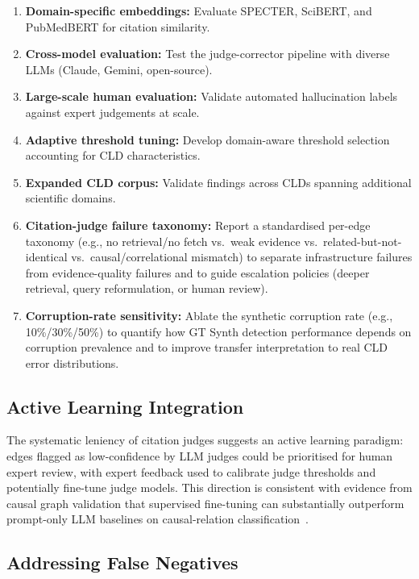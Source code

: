 \begin{enumerate}[noitemsep]
    \item \textbf{Domain-specific embeddings:} Evaluate SPECTER, SciBERT, and PubMedBERT for citation similarity.
    \item \textbf{Cross-model evaluation:} Test the judge-corrector pipeline with diverse LLMs (Claude, Gemini, open-source).
    \item \textbf{Large-scale human evaluation:} Validate automated hallucination labels against expert judgements at scale.
    \item \textbf{Adaptive threshold tuning:} Develop domain-aware threshold selection accounting for CLD characteristics.
    \item \textbf{Expanded CLD corpus:} Validate findings across CLDs spanning additional scientific domains.
    \item \textbf{Citation-judge failure taxonomy:} Report a standardised per-edge taxonomy (e.g., no retrieval/no fetch vs.\ weak evidence vs.\ related-but-not-identical vs.\ causal/correlational mismatch) to separate infrastructure failures from evidence-quality failures and to guide escalation policies (deeper retrieval, query reformulation, or human review).
    \item \textbf{Corruption-rate sensitivity:} Ablate the synthetic corruption rate (e.g., 10\%/30\%/50\%) to quantify how GT Synth detection performance depends on corruption prevalence and to improve transfer interpretation to real CLD error distributions.
\end{enumerate}

\subsection{Active Learning Integration}

The systematic leniency of citation judges suggests an active learning paradigm: edges flagged as low-confidence by LLM judges could be prioritised for human expert review, with expert feedback used to calibrate judge thresholds and potentially fine-tune judge models. This direction is consistent with evidence from causal graph validation that supervised fine-tuning can substantially outperform prompt-only LLM baselines on causal-relation classification~\citep{susanti2024prompting}.

\subsection{Addressing False Negatives}

